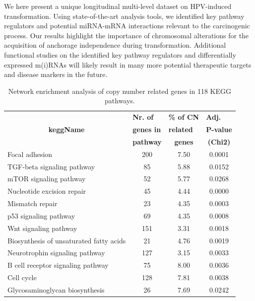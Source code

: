 We here present a unique longitudinal multi-level dataset on HPV-induced transformation. Using state-of-the-art analysis tools, we identified key pathway regulators and potential miRNA-mRNA interactions relevant to the carcinogenic process. Our results highlight the importance of chromosomal alterations for the acquisition of anchorage independence during transformation. Additional functional studies on the identified key pathway regulators and differentially expressed m(i)RNAs will likely result in many more potential therapeutic targets and disease markers in the future.
\begin{table}[htbp]
  \centering
  \caption{Network enrichment analysis of copy number related genes in 118 KEGG pathways.}
    \begin{tabular}{lccc}
    \hline\hline
    & \multicolumn{1}{l}{\textbf{Nr. of }} & \multicolumn{1}{l}{\textbf{\% of CN      }} & \multicolumn{1}{l}{\textbf{Adj.}} \\
    \multicolumn{1}{c}{\textbf{keggName}} & \multicolumn{1}{l}{\textbf{genes in}} & \multicolumn{1}{l}{\textbf{related}} & \multicolumn{1}{l}{\textbf{P-value}} \\
    & \multicolumn{1}{p{3.89em}}{\textbf{pathway}} & \multicolumn{1}{p{4.39em}}{\textbf{genes}} & \multicolumn{1}{p{4.165em}}{\textbf{ (Chi2)}} \\
    \hline
    \rowcolor[rgb]{ 1,  1,  0}  Focal adhesion & 200   & 7.50  & 0.0001 \\
    \rowcolor[rgb]{ 1,  1,  0}  TGF-beta signaling pathway & 85    & 5.88  & 0.0152 \\
    \rowcolor[rgb]{ 1,  1,  0}  mTOR signaling pathway & 52    & 5.77  & 0.0268 \\
    Nucleotide excision repair & 45    & 4.44  & 0.0000 \\
    Mismatch repair & 23    & 4.35  & 0.0003 \\
    p53 signaling pathway & 69    & 4.35  & 0.0008 \\
    Wnt signaling pathway & 151   & 3.31  & 0.0018 \\
    Biosynthesis of unsaturated fatty acids & 21    & 4.76  & 0.0019 \\
    Neurotrophin signaling pathway & 127   & 3.15  & 0.0033 \\
    B cell receptor signaling pathway & 75    & 8.00  & 0.0036 \\
    Cell cycle & 128   & 7.81  & 0.0038 \\
    Glycosaminoglycan biosynthesis & 26    & 7.69  & 0.0242 \\

\end{tabular}
\end{table}
